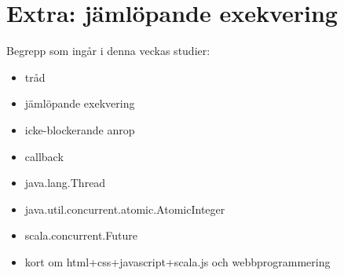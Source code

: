 \chapter{Extra: jämlöpande exekvering}\label{chapter:W14}
Begrepp som ingår i denna veckas studier:
\begin{itemize}[noitemsep,label={$\square$},leftmargin=*]
\item tråd
\item jämlöpande exekvering
\item icke-blockerande anrop
\item callback
\item java.lang.Thread
\item java.util.concurrent.atomic.AtomicInteger
\item scala.concurrent.Future
\item kort om html+css+javascript+scala.js och webbprogrammering\end{itemize}

